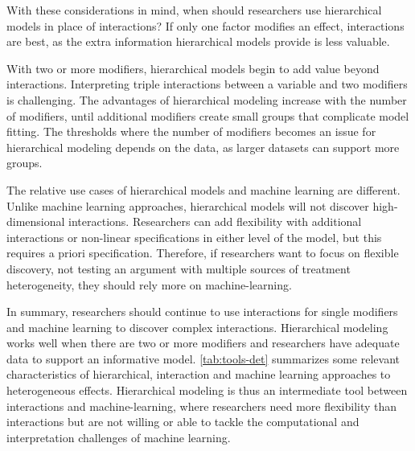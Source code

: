 \documentclass[12pt]{article}
\begin{document}
With these considerations in mind, when should researchers use hierarchical models in place of interactions?
If only one factor modifies an effect, interactions are best, as the extra information hierarchical models provide is less valuable. 


With two or more modifiers, hierarchical models begin to add value beyond interactions. 
Interpreting triple interactions between a variable and two modifiers is challenging. 
The advantages of hierarchical modeling increase with the number of modifiers, until additional modifiers create small groups that complicate model fitting. 
The thresholds where the number of modifiers becomes an issue for hierarchical modeling depends on the data, as larger datasets can support more groups. 


The relative use cases of hierarchical models and machine learning are different. 
Unlike machine learning approaches, hierarchical models will not discover high-dimensional interactions. 
Researchers can add flexibility with additional interactions or non-linear specifications in either level of the model, but this requires a priori specification. 
Therefore, if researchers want to focus on flexible discovery, not testing an argument with multiple sources of treatment heterogeneity, they should rely more on machine-learning. 


In summary, researchers should continue to use interactions for single modifiers and machine learning to discover complex interactions. 
Hierarchical modeling works well when there are two or more modifiers and researchers have adequate data to support an informative model.  
\autoref{tab:tools-det} summarizes some relevant characteristics of hierarchical, interaction and machine learning approaches to heterogeneous effects. 
Hierarchical modeling is thus an intermediate tool between interactions and machine-learning, where researchers need more flexibility than interactions but are not willing or able to tackle the computational and interpretation challenges of machine learning. 
\end{document}
